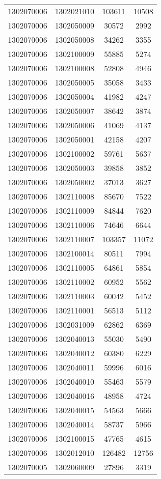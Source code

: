 \begin{longtable}{llcc}
1302070006 & 1302021010 & 103611 & 10508\\
1302070006 & 1302050009 & 30572 & 2992\\
1302070006 & 1302050008 & 34262 & 3355\\
1302070006 & 1302100009 & 55885 & 5274\\
1302070006 & 1302100008 & 52808 & 4946\\
1302070006 & 1302050005 & 35058 & 3433\\
1302070006 & 1302050004 & 41982 & 4247\\
1302070006 & 1302050007 & 38642 & 3874\\
1302070006 & 1302050006 & 41069 & 4137\\
1302070006 & 1302050001 & 42158 & 4207\\
1302070006 & 1302100002 & 59761 & 5637\\
1302070006 & 1302050003 & 39858 & 3852\\
1302070006 & 1302050002 & 37013 & 3627\\
1302070006 & 1302110008 & 85670 & 7522\\
1302070006 & 1302110009 & 84844 & 7620\\
1302070006 & 1302110006 & 74646 & 6644\\
1302070006 & 1302110007 & 103357 & 11072\\
1302070006 & 1302100014 & 80511 & 7994\\
1302070006 & 1302110005 & 64861 & 5854\\
1302070006 & 1302110002 & 60952 & 5562\\
1302070006 & 1302110003 & 60042 & 5452\\
1302070006 & 1302110001 & 56513 & 5112\\
1302070006 & 1302031009 & 62862 & 6369\\
1302070006 & 1302040013 & 55030 & 5490\\
1302070006 & 1302040012 & 60380 & 6229\\
1302070006 & 1302040011 & 59996 & 6016\\
1302070006 & 1302040010 & 55463 & 5579\\
1302070006 & 1302040016 & 48958 & 4724\\
1302070006 & 1302040015 & 54563 & 5666\\
1302070006 & 1302040014 & 58737 & 5966\\
1302070006 & 1302100015 & 47765 & 4615\\
1302070006 & 1302012010 & 126482 & 12756\\
1302070005 & 1302060009 & 27896 & 3319\\

\end{longtable}
